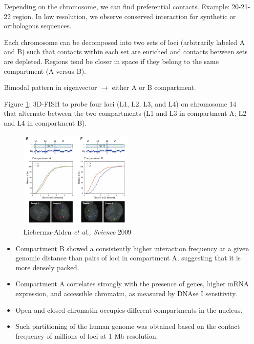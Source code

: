 Depending on the chromosome, we can find preferential contacts. Example: 20-21-22 region. In low resolution, we observe conserved interaction for synthetic or orthologous sequences.

Each chromosome can be decomposed into two sets of loci (arbitrarily labeled A and B) such that contacts within each set are enriched and contacts between sets are depleted. Regions tend be closer in space if they belong to the same compartment (A versus B).

Bimodal pattern in eigenvector $\rightarrow$ either A or B compartment.

Figure \ref{fig:fish}: 3D-FISH to probe four loci (L1, L2, L3, and L4) on chromosome 14 that alternate between the two compartments (L1 and L3 in compartment A; L2 and L4 in compartment B).

\begin{figure}
\centering
\includegraphics[width=0.5\textwidth]{../_resources/Screenshot_2022-10-19_at_09-06-00.png}
\caption{Lieberma-Aiden \emph{et al., Science} 2009}
\label{fig:fish}
\end{figure}

\begin{itemize}
\tightlist
\item
  Compartment B showed a consistently higher interaction frequency at a given genomic distance than pairs of loci in compartment A, suggesting that it is more densely packed.
\item
  Compartment A correlates strongly with the presence of genes, higher mRNA expression, and accessible chromatin, as measured by DNAse I sensitivity.
\item
  Open and closed chromatin occupies different compartments in the nucleus.
\item
  Such partitioning of the human genome was obtained based on the contact frequency of millions of loci at 1 Mb resolution.
\end{itemize}


